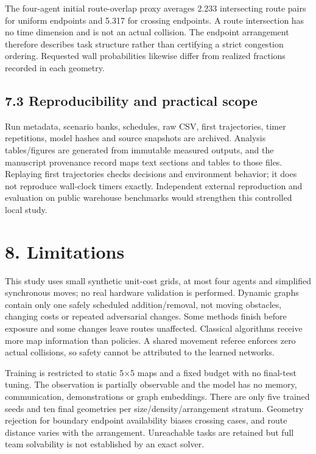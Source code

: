 \documentclass[10pt,a4paper]{article}
\begin{document}
The four-agent initial route-overlap proxy averages 2.233 intersecting route pairs for uniform endpoints and 5.317 for crossing endpoints. A route intersection has no time dimension and is not an actual collision. The endpoint arrangement therefore describes task structure rather than certifying a strict congestion ordering. Requested wall probabilities likewise differ from realized fractions recorded in each geometry.



\subsection*{7.3 Reproducibility and practical scope}



Run metadata, scenario banks, schedules, raw CSV, first trajectories, timer repetitions, model hashes and source snapshots are archived. Analysis tables/figures are generated from immutable measured outputs, and the manuscript provenance record maps text sections and tables to those files. Replaying first trajectories checks decisions and environment behavior; it does not reproduce wall-clock timers exactly. Independent external reproduction and evaluation on public warehouse benchmarks would strengthen this controlled local study.

\section*{8. Limitations}



This study uses small synthetic unit-cost grids, at most four agents and simplified synchronous moves; no real hardware validation is performed. Dynamic graphs contain only one safely scheduled addition/removal, not moving obstacles, changing costs or repeated adversarial changes. Some methods finish before exposure and some changes leave routes unaffected. Classical algorithms receive more map information than policies. A shared movement referee enforces zero actual collisions, so safety cannot be attributed to the learned networks.



Training is restricted to static 5×5 maps and a fixed budget with no final-test tuning. The observation is partially observable and the model has no memory, communication, demonstrations or graph embeddings. There are only five trained seeds and ten final geometries per size/density/arrangement stratum. Geometry rejection for boundary endpoint availability biases crossing cases, and route distance varies with the arrangement. Unreachable tasks are retained but full team solvability is not established by an exact solver.
\end{document}
